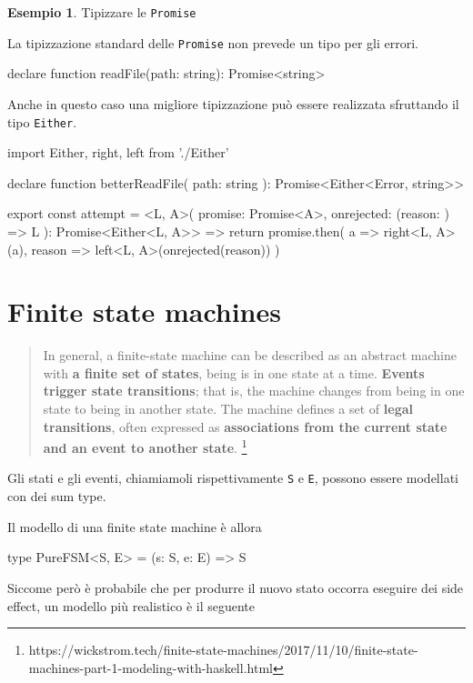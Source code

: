 \documentclass[12pt]{article}
\theoremstyle{definition}
\newtheorem{example}{Esempio}[subsection]
\newenvironment{code}
  {\vspace{0.5cm} \VerbatimEnvironment\begin{typescriptcode}}
  {\end{typescriptcode} \vspace{0.2cm}}
\begin{document}
\begin{example}
Tipizzare le \texttt{Promise}

La tipizzazione standard delle \texttt{Promise} non prevede un tipo per gli errori.

\begin{code}
declare function readFile(path: string): Promise<string>
\end{code}

Anche in questo caso una migliore tipizzazione può essere realizzata sfruttando il tipo \texttt{Either}.

\begin{code}
import { Either, right, left } from './Either'

declare function betterReadFile(
  path: string
): Promise<Either<Error, string>>

export const attempt = <L, A>(
  promise: Promise<A>,
  onrejected: (reason: {}) => L
): Promise<Either<L, A>> => {
  return promise.then(
    a => right<L, A>(a),
    reason => left<L, A>(onrejected(reason))
  )
}
\end{code}
\end{example}

\newpage
\section{Finite state machines}

\begin{quote}
In general, a finite-state machine can be described as an abstract machine with \textbf{a finite set of states},
being is in one state at a time. \textbf{Events trigger state transitions}; that is, the machine changes from being in one
state to being in another state. The machine defines a set of \textbf{legal transitions}, often expressed as \textbf{associations
from the current state and an event to another state}.
\footnote{https://wickstrom.tech/finite-state-machines/2017/11/10/finite-state-machines-part-1-modeling-with-haskell.html}
\end{quote}

Gli stati e gli eventi, chiamiamoli rispettivamente \texttt{S} e \texttt{E}, possono essere modellati con dei sum type.

Il modello di una finite state machine è allora

\begin{code}
type PureFSM<S, E> = (s: S, e: E) => S
\end{code}

Siccome però è probabile che per produrre il nuovo stato occorra eseguire dei side effect, un modello più realistico è il seguente
\end{document}
